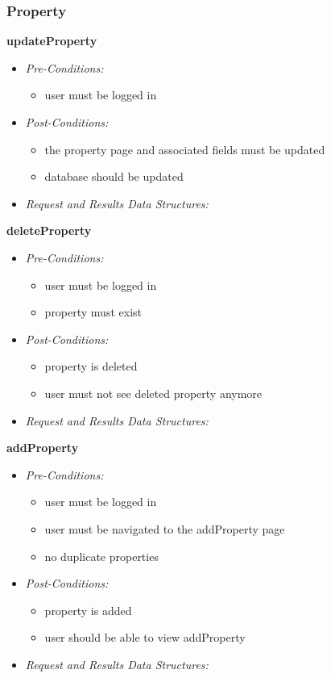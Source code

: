 \documentclass[a4paper,12pt]{article}
\begin{document}

\subsubsection{Property}
\textbf{\large{updateProperty}}
	\begin{itemize}
		\item \textit{Pre-Conditions:}
			\begin{itemize}
				\item user must be logged in 
			\end{itemize}
		\item \textit{Post-Conditions:}
			\begin{itemize}
				\item the property page and associated fields must be updated
				\item database should be updated 
			\end{itemize}
		\item \textit{Request and Results Data Structures:}
	\end{itemize}
\textbf{{deleteProperty}}
	\begin{itemize}
		\item \textit{Pre-Conditions:}
			\begin{itemize}
				\item user must be logged in 
				\item property must exist
			\end{itemize}
		\item \textit{Post-Conditions:}
			\begin{itemize}
				\item property is deleted
				\item user must not see deleted property anymore
			\end{itemize}
		\item \textit{Request and Results Data Structures:}
	\end{itemize}
\textbf{{addProperty}}
	\begin{itemize}
		\item \textit{Pre-Conditions:}
			\begin{itemize}
				\item user must be logged in
				\item user must be navigated to the addProperty page 
				\item no duplicate properties
			\end{itemize}
		\item \textit{Post-Conditions:}
			\begin{itemize}
				\item property is added
				\item user should be able to view addProperty
			\end{itemize}
		\item \textit{Request and Results Data Structures:}
	\end{itemize}
\end{document}
